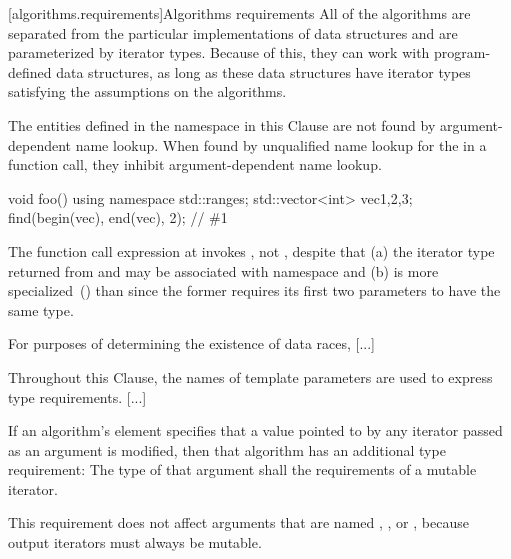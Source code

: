 [algorithms.requirements]{Algorithms requirements}
\pnum
All of the algorithms are separated from the particular implementations of data structures and are
parameterized by iterator types.
Because of this, they can work with program-defined data structures, as long
as these data structures have iterator types satisfying the assumptions on the algorithms.

\begin{addedblock}
\pnum
The entities defined in the  namespace
in this Clause are not found by argument-dependent
name lookup. When found by
unqualified name lookup for the
 in a function call, they
inhibit argument-dependent name lookup.

\begin{example}
\begin{codeblock}
void foo() {
    using namespace std::ranges;
    std::vector<int> vec{1,2,3};
    find(begin(vec), end(vec), 2); // \#1
}
\end{codeblock}
The function call expression at  invokes ,
not , despite that (a) the iterator type returned from 
and  may be associated with namespace  and (b)
 is more specialized~() than
 since the former requires its first two parameters to
have the same type.
\end{example}
\end{addedblock}

\pnum
For purposes of determining the existence of data races, [...]

\pnum
Throughout this Clause, 
the names of template parameters are used to express type requirements. [...]

\pnum
If an algorithm's
\effects
element specifies that a value pointed to by any iterator passed
as an argument is modified, then that algorithm has an additional
type requirement:
The type of that argument shall  the requirements
of a mutable iterator.
\begin{note}
This requirement does not affect arguments that are named
,
,
or
,
because output iterators must always be mutable.
\end{note}

